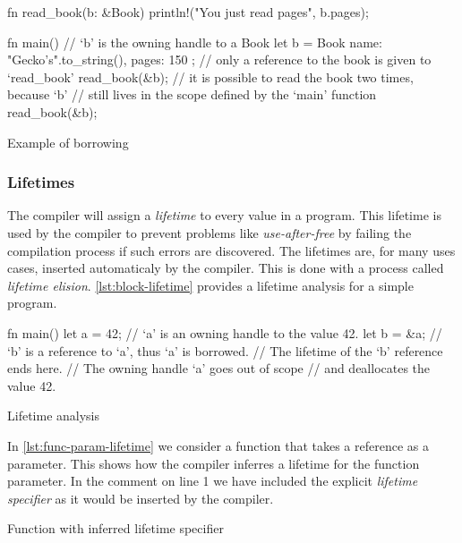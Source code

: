 \begin{listing}[tb]
\begin{rustcode}
fn read_book(b: &Book) {
  println!("You just read {} pages", b.pages);
}

fn main() {
  // `b' is the owning handle to a Book
  let b = Book { name: "Gecko's".to_string(), pages: 150 };
  // only a reference to the book is given to `read_book'
  read_book(&b);
  // it is possible to read the book two times, because `b'
  // still lives in the scope defined by the `main' function
  read_book(&b);
 }
\end{rustcode}
\caption{Example of borrowing}
\label{lst:borrowing_handle}
\end{listing}

\subsubsection{Lifetimes}
\label{ssec:lifetimes}

The {\rust} compiler will assign a \emph{lifetime} to every value in a program.
This lifetime is used by the compiler to prevent problems like \emph{use-after-free} by failing the compilation process if such errors are discovered.
The lifetimes are, for many uses cases, inserted automaticaly by the compiler.
This is done with a process called \emph{lifetime elision}.
\autoref{lst:block-lifetime} provides a lifetime analysis for a simple program.

\begin{listing}[H]
  \begin{rustcode}
fn main() {
  let a = 42;   // `a' is an owning handle to the value 42.
  {
    let b = &a; // `b' is a reference to `a', thus `a' is borrowed.
  }             // The lifetime of the `b' reference ends here.
}               // The owning handle `a' goes out of scope
                // and deallocates the value 42.
  \end{rustcode}
  \caption{Lifetime analysis}
  \label{lst:block-lifetime}
\end{listing}


In \autoref{lst:func-param-lifetime} we consider a function that takes a reference as a parameter.
This shows how the compiler inferres a lifetime for the function parameter.
In the comment on line 1 we have included the explicit \emph{lifetime specifier} as it would be inserted by the compiler.

\begin{listing}[H]
  \begin{rustcode}
// foo<'a>(x: &'a u32) { // lifetime specifier inferred by the compiler
fn foo(x: &u32) {
} // The lifetime of the `x' reference ends here.
fn main() {
  let a = 42; // `a' is an owning handle to the value 42.
  foo(&a);    // `a' is borrowed by the `foo' function.
}             // The owning handle `a' goes out of scope
              // and deallocates the value 42.
  \end{rustcode}
  \caption{Function with inferred lifetime specifier}
  \label{lst:func-param-lifetime}
\end{listing}

